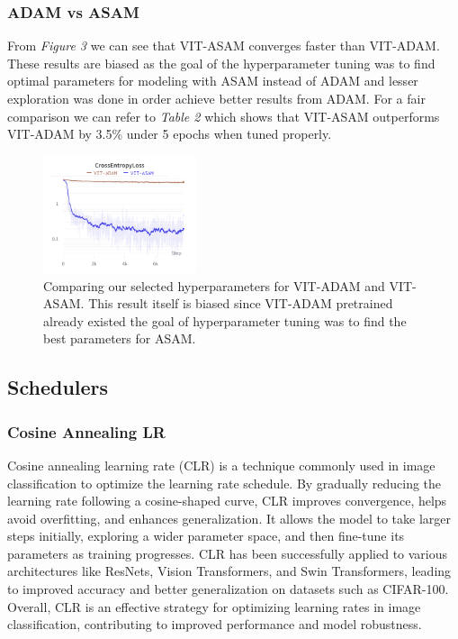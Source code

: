 \documentclass{article}
\begin{document}
\subsubsection{ADAM vs ASAM}
From \textit{Figure 3} we can see that VIT-ASAM converges faster than VIT-ADAM.
These results are biased as the goal of the hyperparameter tuning was to find optimal parameters for modeling with ASAM instead of ADAM and lesser exploration was done in order achieve better results from ADAM.
For a fair comparison we can refer to \textit{Table 2} which shows that VIT-ASAM outperforms VIT-ADAM by 3.5\% under 5 epochs when tuned properly.

\begin{figure}[ht]
    \vskip 0.2in
    \centering
    \includegraphics[width=0.4\textwidth]{optimizers.png}
    \caption{Comparing our selected hyperparameters for VIT-ADAM and VIT-ASAM. This result itself is biased since VIT-ADAM pretrained already existed the goal of hyperparameter tuning was to find the best parameters for ASAM.}

    \vskip -0.2in
\end{figure}

\subsection{Schedulers}
\subsubsection{Cosine Annealing LR}
Cosine annealing learning rate (CLR) is a technique commonly used in image classification to optimize the learning rate schedule.
By gradually reducing the learning rate following a cosine-shaped curve, CLR improves convergence, helps avoid overfitting, and enhances generalization.
It allows the model to take larger steps initially, exploring a wider parameter space, and then fine-tune its parameters as training progresses.
CLR has been successfully applied to various architectures like ResNets, Vision Transformers, and Swin Transformers, leading to improved accuracy and better generalization on datasets such as CIFAR-100.
Overall, CLR is an effective strategy for optimizing learning rates in image classification, contributing to improved performance and model robustness.
\end{document}
